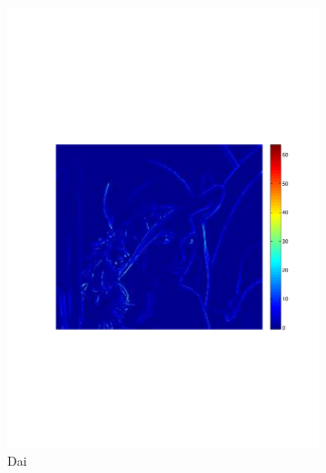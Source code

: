 \documentclass[twocolumn]{el-author}
\begin{document}
\begin{figure}[t]
\begin{subfigure}[b]{0.32\linewidth}
    \centering
    \includegraphics[width=\linewidth]{5Porikli2}
    \caption{Dai~\cite{Dai_ET_2014}}
    \label{fig:minimax_path:path}
\end{subfigure}
\begin{subfigure}[b]{0.32\linewidth}
    \centering

\end{subfigure}
\end{figure}
\end{document}
